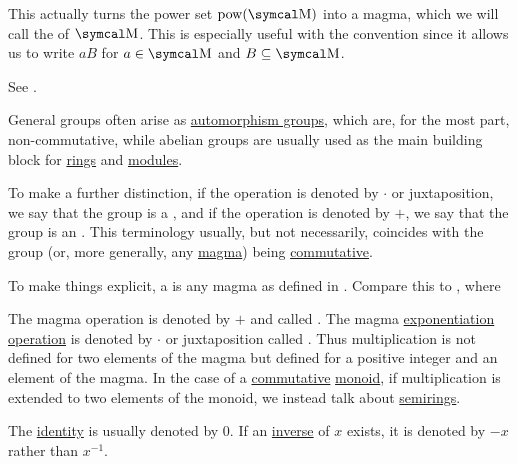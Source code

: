 \begin{definition}
\begin{DefEnum}
    This actually turns the power set \( \Pow(\CM) \) into a magma, which we will call the  of \( \CM \). This is especially useful with the convention  since it allows us to write \( aB \) for \( a \in \CM \) and \( B \subseteq \CM \).

    See .
  \end{DefEnum}
\end{definition}

\begin{remark}\label{remark:additive_magma}
  General groups often arise as \hyperref[def:automorphism_group]{automorphism groups}, which are, for the most part, non-commutative, while abelian groups are usually used as the main building block for \hyperref[def:semiring/ring]{rings} and \hyperref[def:left_module]{modules}.

  To make a further distinction, if the operation is denoted by \( \cdot \) or juxtaposition, we say that the group is a , and if the operation is denoted by \( + \), we say that the group is an . This terminology usually, but not necessarily, coincides with the group (or, more generally, any \hyperref[def:magma]{magma}) being \hyperref[def:magma/commutative]{commutative}.

  To make things explicit, a  is any magma as defined in . Compare this to , where
  \begin{RemEnum}
     The magma operation is denoted by \( + \) and called .
     The magma \hyperref[def:magma/exponentiation]{exponentiation operation} is denoted by \( \cdot \) or juxtaposition called . Thus multiplication is not defined for two elements of the magma but defined for a positive integer and an element of the magma. In the case of a \hyperref[def:magma/commutative]{commutative} \hyperref[def:unital_magma/associative]{monoid}, if multiplication is extended to two elements of the monoid, we instead talk about \hyperref[def:semiring]{semirings}.

     The \hyperref[def:magma_identity]{identity} is usually denoted by \( 0 \).
     If an \hyperref[def:unital_magma_inverse_element]{inverse} of \( x \) exists, it is denoted by \( -x \) rather than \( x^{-1} \).
  \end{RemEnum}
\end{remark}

